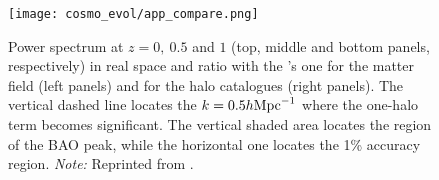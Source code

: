 \begin{figure}[!htb]
    \centering
    \texttt{[image: cosmo\_evol/app\_compare.png]}
    \caption{Power spectrum at $z = 0,\ 0.5$ and $1$ (top, middle and bottom panels, respectively) in real space and ratio with the \nbody’s one for the matter field (left panels) and for the halo catalogues (right panels). The vertical dashed line locates the $k = 0.5h\text{Mpc}^{-1}$ where the one-halo term becomes significant. The vertical shaded area locates the region of the BAO peak, while the horizontal one locates the 1\% accuracy region.  \textit{Note:} Reprinted from \textcite{2017JCAP...07..050M}.}
    \label{fig:app_compare}
\end{figure}